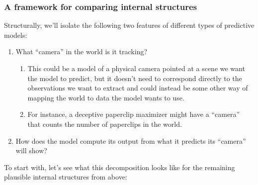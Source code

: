\documentclass[
  onecolumn,
  nonatbib,
]{miri-tech-article}
\begin{document}
\subsubsection{A framework for comparing internal structures}

Structurally, we'll isolate the following two features of different types of predictive models:



\begin{enumerate}
\item What ``camera'' in the world is it tracking?
    \begin{enumerate}
    \item This could be a model of a physical camera pointed at a scene we want the model to predict, but it doesn't need to correspond directly to the observations we want to extract and could instead be some other way of mapping the world to data the model wants to use.
    \item For instance, a deceptive paperclip maximizer might have a ``camera'' that counts the number of paperclips in the world.
    \end{enumerate}
\item How does the model compute its output from what it predicts its ``camera'' will show?
\end{enumerate}

To start with, let's see what this decomposition looks like for the remaining plausible internal structures from above:
\end{document}
